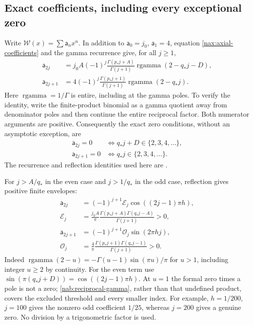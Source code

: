 \subsection{Exact coefficients, including every exceptional zero}

Write $\mathcal W(x)=\sum\mathsf a_nx^n$. In addition to
$\mathsf a_0=j_0$, $\mathsf a_1=4$, equation
\eqref{nax:axial-coefficients} and the gamma recurrence give, for all
$j\geq1$,
\begin{equation}\label{nab:reciprocal-gamma}
 \begin{split}
 \mathsf a_{2j}
   &=j_0A(-1)^j\frac{\Gamma(p_*j+A)}{\Gamma(j+1)}
                   \operatorname{rgamma}(2-q_*j-D),\\
 \mathsf a_{2j+1}
   &=4(-1)^j\frac{\Gamma(p_*j+1)}{\Gamma(j+1)}
                   \operatorname{rgamma}(2-q_*j).
 \end{split}
\end{equation}
Here $\operatorname{rgamma}=1/\Gamma$ is entire, including at the
gamma poles. To verify the identity, write the finite-product binomial
as a gamma quotient away from denominator poles and then continue the
entire reciprocal factor. Both numerator arguments are positive.
Consequently the exact zero conditions, without an asymptotic exception,
are
\begin{equation}\label{nab:exact-zeros}
 \begin{split}
 \mathsf a_{2j}=0&\iff q_*j+D\in\{2,3,4,\ldots\},\\
 \mathsf a_{2j+1}=0&\iff q_*j\in\{2,3,4,\ldots\}.
 \end{split}
\end{equation}
The recurrence and reflection identities used here are
\cite[\S5.5, (5.5.1), (5.5.3)]{askeyRoyDLMF5}.

For $j>A/q_*$ in the even case and $j>1/q_*$ in the odd case,
reflection gives positive finite envelopes:
\begin{equation}\label{nab:envelopes}
 \begin{split}
 \mathsf a_{2j}&=(-1)^{j+1}\mathcal E_j
                          \cos((2j-1)\pi h),\\
 \mathcal E_j&=\frac{j_0A}{\pi}
       \frac{\Gamma(p_*j+A)\Gamma(q_*j-A)}{\Gamma(j+1)}>0,\\
 \mathsf a_{2j+1}&=(-1)^{j+1}\mathcal O_j\sin(2\pi hj),\\
 \mathcal O_j&=\frac4\pi
       \frac{\Gamma(p_*j+1)\Gamma(q_*j-1)}{\Gamma(j+1)}>0.
 \end{split}
\end{equation}
Indeed $\operatorname{rgamma}(2-u)
=-\Gamma(u-1)\sin(\pi u)/\pi$ for $u>1$, including integer
$u\geq2$ by continuity. For the even term use
$\sin(\pi(q_*j+D))=\cos((2j-1)\pi h)$. At $u=1$ the formal
zero times a pole is not a zero; \eqref{nab:reciprocal-gamma}, rather
than that undefined product, covers the excluded threshold and every
smaller index. For example, $h=1/200$, $j=100$ gives the nonzero odd
coefficient $1/25$, whereas $j=200$ gives a genuine zero. No division
by a trigonometric factor is used.

